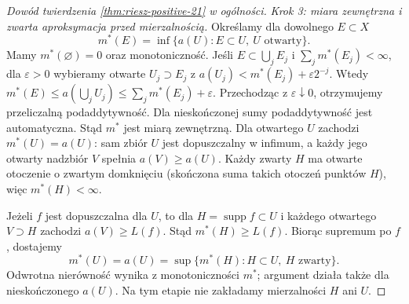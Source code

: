 \begin{proof}[Dowód twierdzenia \ref{thm:riesz-positive-21} w ogólności]
\emph{Krok 3: miara zewnętrzna i zwarta aproksymacja przed mierzalnością.}
Określamy dla dowolnego $E\subset X$
\begin{equation}\label{it:eq:radon-outer-general}
 m^*(E)=\inf\{a(U):E\subset U,\ U\text{ otwarty}\}.
\end{equation}
Mamy $m^*(\varnothing)=0$ oraz monotoniczność. Jeśli $E\subset\bigcup_jE_j$ i $\sum_jm^*(E_j)<\infty$, dla $\varepsilon>0$ wybieramy otwarte $U_j\supset E_j$ z $a(U_j)<m^*(E_j)+\varepsilon2^{-j}$. Wtedy
$m^*(E)\le a(\bigcup_jU_j)\le\sum_jm^*(E_j)+\varepsilon$.
Przechodząc z $\varepsilon\downarrow0$, otrzymujemy przeliczalną podaddytywność. Dla nieskończonej sumy podaddytywność jest automatyczna. Stąd $m^*$ jest miarą zewnętrzną. Dla otwartego $U$ zachodzi $m^*(U)=a(U)$: sam zbiór $U$ jest dopuszczalny w infimum, a każdy jego otwarty nadzbiór $V$ spełnia $a(V)\ge a(U)$. Każdy zwarty $H$ ma otwarte otoczenie o zwartym domknięciu (skończona suma takich otoczeń punktów $H$), więc $m^*(H)<\infty$.

Jeżeli $f$ jest dopuszczalna dla $U$, to dla $H=\operatorname{supp}f\subset U$ i każdego otwartego $V\supset H$ zachodzi $a(V)\ge L(f)$. Stąd $m^*(H)\ge L(f)$. Biorąc supremum po $f$, dostajemy
\begin{equation}\label{it:eq:radon-outer-inner-general}
 m^*(U)=a(U)=\sup\{m^*(H):H\subset U,\ H\text{ zwarty}\}.
\end{equation}
Odwrotna nierówność wynika z monotoniczności $m^*$; argument działa także dla nieskończonego $a(U)$. Na tym etapie nie zakładamy mierzalności $H$ ani $U$.


\end{proof}
